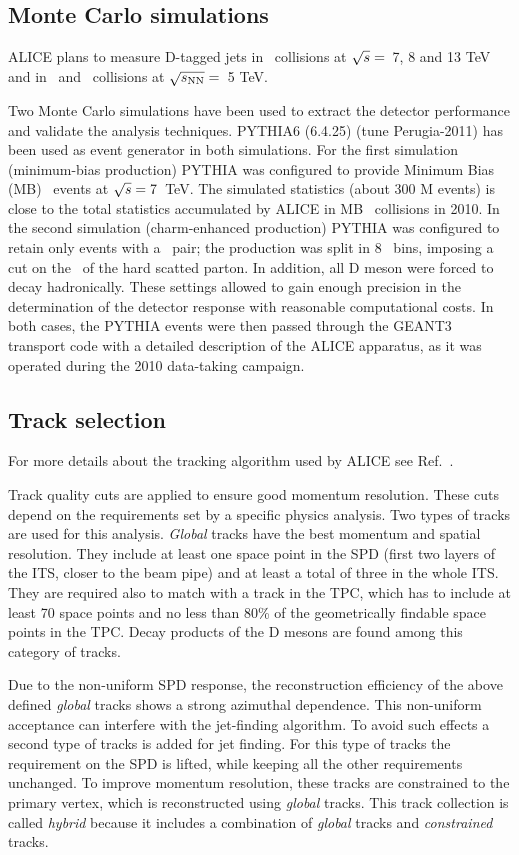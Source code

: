 \documentclass[a4paper]{jpconf}
\begin{document}
\subsection{Monte Carlo simulations}
ALICE plans to measure D-tagged jets in \pp\ collisions at $\sqrt{s}=$~7, 8 and 13 TeV and in \pPb\ and \PbPb\ collisions at $\sqrt{s_{\rm NN}}=$~5 TeV.

Two Monte Carlo simulations have been used to extract the detector performance and validate the analysis techniques.
PYTHIA6 (6.4.25)\cite{Sjostrand:2006} (tune Perugia-2011) has been used as event generator in both simulations.
For the first simulation (minimum-bias production) PYTHIA was configured to provide Minimum Bias (MB) \pp\ events at $\sqrt{s}=7$~TeV.
The simulated statistics (about 300 M events) is close to the total statistics accumulated by ALICE in MB \pp\ collisions
in 2010. In the second simulation (charm-enhanced production) PYTHIA was configured to retain only events with a \ccbar\ pair; the production
was split in 8 \pthard\ bins, imposing a cut on the \pT\ of the hard scatted parton. In addition, all D meson were forced
to decay hadronically. These settings allowed to gain enough precision in the determination of the detector response with reasonable
computational costs.
In both cases, the PYTHIA events were then passed through the GEANT3 transport code with a detailed description of the ALICE apparatus,
as it was operated during the 2010 data-taking campaign.

\subsection{Track selection}
For more details about the tracking algorithm used by ALICE see Ref.~\cite{ALICE:2014b}.

Track quality cuts are applied to ensure good momentum resolution. These cuts
depend on the requirements set by a specific physics analysis.
Two types of tracks are used for this analysis. \emph{Global} tracks have the best
momentum and spatial resolution. They include at least one space point in the SPD (first two
layers of the ITS, closer to the beam pipe) and at least a total of three in the whole ITS. They are required also to
match with a track in the TPC, which has to include at least 70 space points and no less than 80\% of the geometrically findable 
space points in the TPC. Decay products of the D mesons are found among this category of tracks.

Due to the non-uniform SPD response, the reconstruction efficiency of the above defined \emph{global} tracks shows a strong azimuthal dependence.
This non-uniform acceptance can interfere with the jet-finding algorithm. To avoid such effects a second type of tracks is added for jet finding.
For this type of tracks the requirement on the SPD is lifted, while keeping all the other requirements unchanged. To improve momentum resolution,
these tracks are constrained to the primary vertex, which is reconstructed using \emph{global} tracks. This track collection is called \emph{hybrid} because
it includes a combination of \emph{global} tracks and \emph{constrained} tracks.
\end{document}
